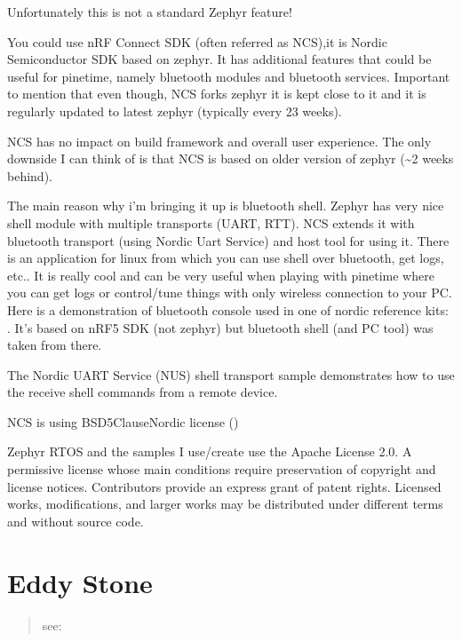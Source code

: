 \documentclass[letterpaper,10pt,english]{sphinxmanual}
\begin{document}
Unfortunately this is not a standard Zephyr feature!

You could use nRF Connect SDK (often referred as NCS),it is Nordic Semiconductor SDK based on zephyr. It has additional features that could be useful for pinetime, namely bluetooth modules and bluetooth services. Important to mention that even though, NCS forks zephyr it is kept close to it and it is regularly updated to latest zephyr (typically every 2\sphinxhyphen{}3 weeks).

NCS has no impact on build framework and overall user experience. The only downside I can think of is that NCS is based on older version of zephyr (\textasciitilde{}2 weeks behind).

The main reason why i’m bringing it up is bluetooth shell. Zephyr has very nice shell module with multiple transports (UART, RTT). NCS extends it with bluetooth transport (using Nordic Uart Service) and host tool for using it. There is an application for linux from which you can use shell over bluetooth, get logs, etc.. It is really cool and can be very useful when playing with pinetime where you can get logs or control/tune things with only wireless connection to your PC. Here is a demonstration of bluetooth console used in one of nordic reference kits:  . It’s based on nRF5 SDK (not zephyr) but bluetooth shell (and PC tool) was taken from there.

The Nordic UART Service (NUS) shell transport sample demonstrates how to use the receive shell commands from a remote device.

NCS is using BSD\sphinxhyphen{}5\sphinxhyphen{}Clause\sphinxhyphen{}Nordic license ()

Zephyr RTOS and the samples I use/create use the Apache License 2.0.
A permissive license whose main conditions require preservation of copyright and license notices. Contributors provide an express grant of patent rights. Licensed works, modifications, and larger works may be distributed under different terms and without source code.


\section{Eddy Stone}
\label{\detokenize{bluetooth:eddy-stone}}\begin{quote}

see:   
\end{quote}
\end{document}
